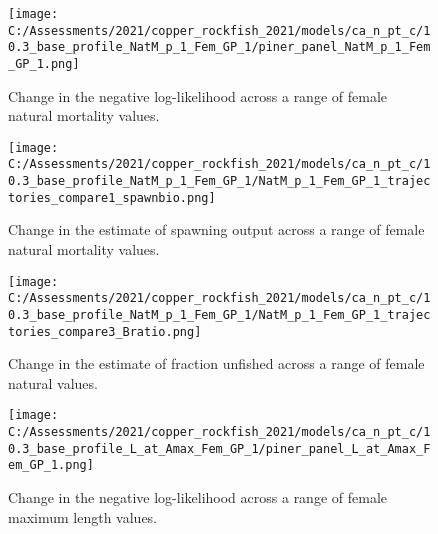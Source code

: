 \documentclass[11pt,
  english,
  a4paper,
]{article}
\begin{document}

\begin{figure}
\centering
\texttt{[image: C:/Assessments/2021/copper\_rockfish\_2021/models/ca\_n\_pt\_c/10.3\_base\_profile\_NatM\_p\_1\_Fem\_GP\_1/piner\_panel\_NatM\_p\_1\_Fem\_GP\_1.png]}
\caption{Change in the negative log-likelihood across a range of female natural mortality values.\label{fig:m-profile}}
\end{figure}

\tagmcend\tagstructend


\begin{figure}
\centering
\texttt{[image: C:/Assessments/2021/copper\_rockfish\_2021/models/ca\_n\_pt\_c/10.3\_base\_profile\_NatM\_p\_1\_Fem\_GP\_1/NatM\_p\_1\_Fem\_GP\_1\_trajectories\_compare1\_spawnbio.png]}
\caption{Change in the estimate of spawning output across a range of female natural mortality values.\label{fig:m-ssb}}
\end{figure}

\tagmcend\tagstructend


\begin{figure}
\centering
\texttt{[image: C:/Assessments/2021/copper\_rockfish\_2021/models/ca\_n\_pt\_c/10.3\_base\_profile\_NatM\_p\_1\_Fem\_GP\_1/NatM\_p\_1\_Fem\_GP\_1\_trajectories\_compare3\_Bratio.png]}
\caption{Change in the estimate of fraction unfished across a range of female natural values.\label{fig:m-depl}}
\end{figure}

\tagmcend\tagstructend


\begin{figure}
\centering
\texttt{[image: C:/Assessments/2021/copper\_rockfish\_2021/models/ca\_n\_pt\_c/10.3\_base\_profile\_L\_at\_Amax\_Fem\_GP\_1/piner\_panel\_L\_at\_Amax\_Fem\_GP\_1.png]}
\caption{Change in the negative log-likelihood across a range of female maximum length values.\label{fig:linf-profile}}
\end{figure}
\end{document}
